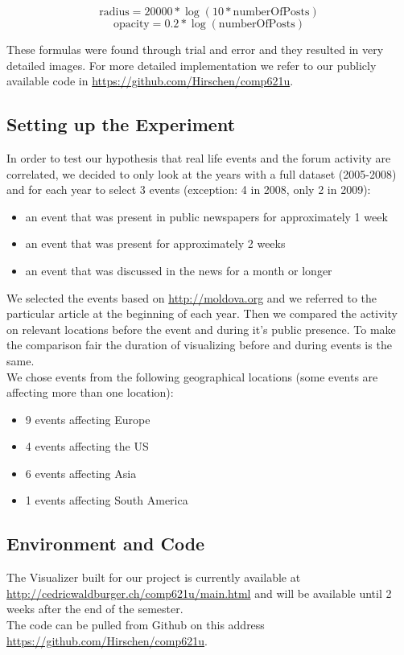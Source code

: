 \documentclass[11pt,a4paper,english]{article}
\begin{document}
		\begin{equation} \label{rad}
			 \mbox{radius} = 20000*\log(10* \mbox{numberOfPosts})
		\end{equation}
		\begin{equation} \label{opa}
			 \mbox{opacity} = 0.2*\log( \mbox{numberOfPosts} )
		\end{equation}

		These formulas were found through trial and error and they resulted in very detailed images. For more detailed implementation we refer to our publicly available code in \url{https://github.com/Hirschen/comp621u}.
		
		\subsection{Setting up the Experiment}
		In order to test our hypothesis that real life events and the forum activity are correlated, we decided to only look at the years with a full dataset (2005-2008) and for each year to select 3 events (exception: 4 in 2008, only 2 in 2009):
		\begin{itemize}
			\item an event that was present in public newspapers for approximately 1 week
			\item an event that was present for approximately 2 weeks
			\item an event that was discussed in the news for a month or longer
		\end{itemize}
		We selected the events based on \url{http://moldova.org} and we referred to the particular article at the beginning of each year. Then we compared the activity on relevant locations before the event and during it's public presence. To make the comparison fair the duration of visualizing before and during events is the same.
		\\ We chose events from the following geographical locations (some events are affecting more than one location):
		\begin{itemize}
			\item 9 events affecting Europe
			\item 4 events affecting the US
			\item 6 events affecting Asia
			\item 1 events affecting South America
		\end{itemize}
		
		\subsection{Environment and Code}
			The Visualizer built for our project is currently available at \\\url{http://cedricwaldburger.ch/comp621u/main.html} and will be available until 2 weeks after the end of the semester. 
			\\The code can be pulled from Github on this address \url{https://github.com/Hirschen/comp621u}.
\end{document}
